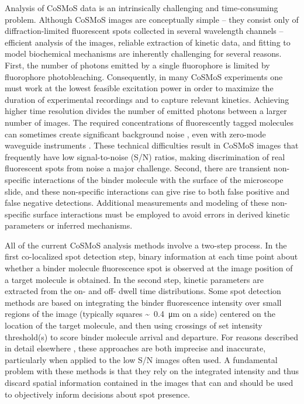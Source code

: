 Analysis of CoSMoS data is an intrinsically challenging and time-consuming problem. Although CoSMoS images are conceptually simple -- they consist only of diffraction-limited fluorescent spots collected in several wavelength channels -- efficient analysis of the images, reliable extraction of kinetic data, and fitting to model biochemical mechanisms are inherently challenging for several reasons. First, the number of photons emitted by a single fluorophore is limited by fluorophore photobleaching. Consequently, in many CoSMoS experiments one must work at the lowest feasible excitation power in order to maximize the duration of experimental recordings and to capture relevant kinetics. Achieving higher time resolution divides the number of emitted photons between a larger number of images. The required concentrations of fluorescently tagged molecules can sometimes create significant background noise \cite{Peng2018-ge, Van_Oijen2011-ig}, even with zero-mode waveguide instruments \cite{Chen2014-jd}. These technical difficulties result in CoSMoS images that frequently have low signal-to-noise (S/N) ratios, making discrimination of real fluorescent spots from noise a major challenge. Second, there are transient non-specific interactions of the binder molecule with the surface of the microscope slide, and these non-specific interactions can give rise to both false positive and false negative detections. Additional measurements and modeling of these non-specific surface interactions must be employed to avoid errors in derived kinetic parameters or inferred mechanisms.

All of the current CoSMoS analysis methods involve a two-step process. In the first co-localized spot detection step, binary information at each time point about whether a binder molecule fluorescence spot is observed at the image position of a target molecule is obtained. In the second step, kinetic parameters are extracted from the on- and off- dwell time distributions. Some spot detection methods are based on integrating the binder fluorescence intensity over small regions of the image (typically squares \SI{0.4}[\sim]{\um} on a side) centered on the location of the target molecule, and then using crossings of set intensity threshold(s) to score binder molecule arrival and departure. For reasons described in detail elsewhere \cite{Friedman2015-nx}, these approaches are both imprecise and inaccurate, particularly when applied to the low S/N images often used. A fundamental problem with these methods is that they rely on the integrated intensity and thus discard spatial information contained in the images that can and should be used to objectively inform decisions about spot presence.

